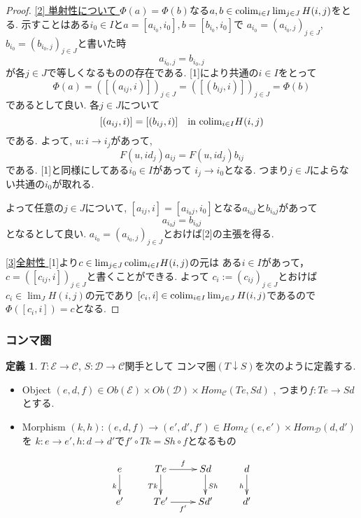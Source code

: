 \documentclass[dvipdfmx,a4paper,11pt]{article}
\newcommand{\colim}{{\rm colim}}
\theoremstyle{definition}
\newtheorem{dfn}[thm]{定義}
\begin{document}
\begin{proof}
\underline{[2] 単射性について }
$\Phi(a)=\Phi(b)$なる$a, b \in \colim_{i \in I} \lim_{j \in J}H(i,j)$をとる. 
示すことはある$i_0 \in I$と$a =[a_{i_0}, i_0], b =[b_{i_0}, i_0]$で
$a_{i_0} = (a_{i_{0},j})_{j \in J}$, $b_{i_0} = (b_{i_{0},j})_{j \in J}$と書いた時
$$
a_{i_{0},j} = b_{i_{0},j}
$$
が各$j \in J$で等しくなるものの存在である. 
[1]により共通の$i \in I$をとって
$$
\Phi(a) = ([(a_{ij}, i)])_{j \in J} = ([(b_{ij}, i)])_{j \in J} = \Phi(b)$$
であるとして良い. 
各$j \in J$について
$$
[(a_{ij}, i)] = [(b_{ij}, i)] \quad \text{in $\colim_{i \in I} H(i,j)$}
$$
である. 
よって, $u : i \to i_{j}$があって, 
$$
F(u, id_{j})a_{ij} = F(u, id_{j})b_{ij}
$$
である. [1]と同様にしてある$i_{0} \in I$があって
$i_{j} \to i_{0}$となる.
つまり$j \in J$によらない共通の$i_{0}$が取れる.

よって任意の$j \in J$について, $[a_{ij}, i] = [a_{i_{0}j}, i_{0}]$となる$a_{i_{0}j}$と$b_{i_{0}j}$があって
$$
a_{i_{0}j} = b_{i_{0}j}
$$
となるとして良い. 
$a_{i_0} = (a_{i_{0},j})_{j \in J}$とおけば[2]の主張を得る. 

\underline{[3]全射性 } 
[1]より$c \in \lim_{j \in J}\colim_{i \in I} H(i,j)$の元は
ある$i \in I$があって， $c= ([c_{ij}, i])_{j \in J}$と書くことができる. 
よって
$c_{i}:=(c_{ij})_{j \in J}$とおけば$c_i \in \lim_{J}H(i,j)$の元であり
$[c_{i} , i] \in \colim_{i \in I} \lim_{j \in J}H(i,j)$であるので
$\Phi([c_i , i])=c$となる. 
\end{proof}

\subsubsection{コンマ圏}
 \begin{tcolorbox}
 [colback = white, colframe = green!35!black, fonttitle = \bfseries,breakable = true]
\begin{dfn}
$T :  \mathcal{E} \to \mathcal{C}$, $S : \mathcal{D} \to \mathcal{C}$関手として
コンマ圏$(T \downarrow S)$を次のように定義する. 
\begin{itemize}
\item Object $(e,d,f) \in Ob(\mathcal{E}) \times Ob(\mathcal{D}) \times Hom_{\mathcal{C}}(Te, Sd)$ , つまり$f : Te \to Sd$とする.
\item Morphism $(k,h) : (e,d,f)  \to (e',d',f') \in Hom_{\mathcal{E}}(e,e') \times Hom_{\mathcal{D}}(d,d') $ を $k : e \to e', h: d \to d'$で$f' \circ Tk = Sh \circ f$となるもの
\end{itemize}

\begin{equation*}
\xymatrix@C=25pt@R=20pt{
e \ar@{->}[d] _{k}&Te\ar@{->}[d]_{Tk}  \ar@{->}[r]^{f} & Sd\ar@{->}[d]^{Sh} &d\ar@{->}[d]_{h}\\
e'&Te'\ar@{->}[r]_{f'} &Sd'&d' \\   
}
\end{equation*}
\end{dfn}
\end{tcolorbox}
\end{document}
